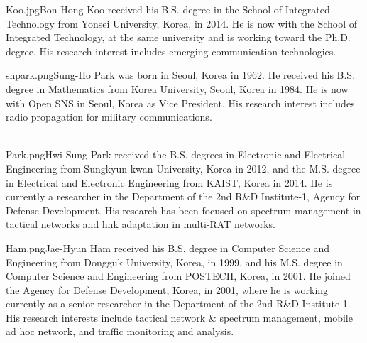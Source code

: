 \documentclass[10pt,twocolumn,twoside]{JCNtran}
\begin{document}
\epsfysize=3.2cm
\begin{biography}{Koo.jpg}{Bon-Hong Koo}
received his B.S. degree in the School of Integrated Technology from Yonsei University, Korea, in 2014. He is now with the School of Integrated Technology, at the same university and is working toward the Ph.D. degree. His research interest includes emerging communication technologies. \\
\end{biography}

\epsfysize=3.0cm
\begin{biography}{shpark.png}{Sung-Ho Park} was born in Seoul, Korea in 1962. He received his B.S. degree in Mathematics from Korea University, Seoul, Korea in 1984. He is now with Open SNS in Seoul, Korea as Vice President. His research interest includes radio propagation for military communications. \\ \\
\end{biography}

\epsfysize=3.0cm
\begin{biography}{Park.png}{Hwi-Sung Park}
received the B.S. degrees in Electronic and Electrical Engineering from Sungkyun-kwan University, Korea in 2012, and the M.S. degree in Electrical and Electronic Engineering from KAIST, Korea in 2014. He is currently a researcher in the Department of the 2nd R\&D Institute-1, Agency for Defense Development. His research has been focused on spectrum management in tactical networks and link adaptation in multi-RAT networks.
\end{biography}

\epsfysize=3.0cm
\begin{biography}{Ham.png}{Jae-Hyun Ham}
received his B.S. degree in Computer Science and Engineering from Dongguk University, Korea, in 1999, and his M.S. degree in Computer Science and Engineering from POSTECH, Korea, in 2001. He joined the Agency for Defense Development, Korea, in 2001, where he is working currently as a senior researcher in the Department of the 2nd R\&D Institute-1. His research interests include tactical network \& spectrum management, mobile ad hoc network, and traffic monitoring and analysis.
\end{biography}
\end{document}
